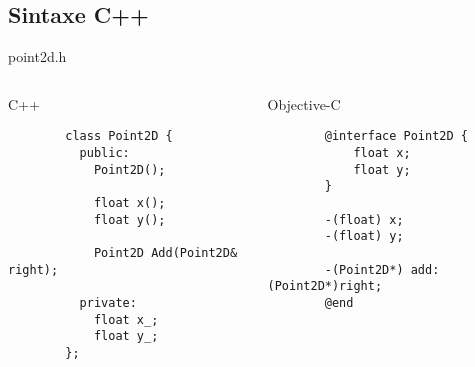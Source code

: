 \documentclass[brazil]{beamer}
\begin{document}
\subsection{Sintaxe C++}

\begin{frame}[fragile]
  point2d.h
  \begin{columns}
    \begin{column}{.5\textwidth}
      \begin{center}
        C++
      \end{center}
      \lstset{language=C++,basicstyle=\tiny}
      \begin{lstlisting}
        class Point2D {
          public:
            Point2D();

            float x();
            float y();

            Point2D Add(Point2D& right);

          private:
            float x_;
            float y_;
        };
      \end{lstlisting}
    \end{column}
    \begin{column}{.5\textwidth}
      \begin{center}
        Objective-C
      \end{center}
      \lstset{language=C++,basicstyle=\tiny}
      \begin{lstlisting}
        @interface Point2D {
            float x;
            float y;
        }

        -(float) x;
        -(float) y;
        
        -(Point2D*) add: (Point2D*)right;
        @end
      \end{lstlisting}
    \end{column}
  \end{columns}
\end{frame}
\end{document}
